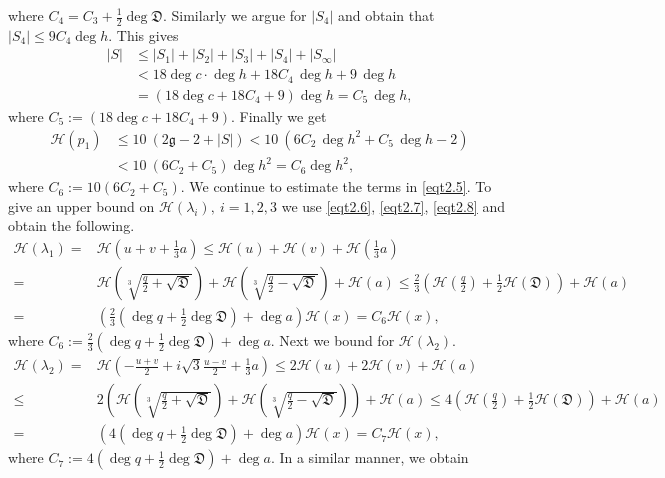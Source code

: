 \documentclass[12pt]{amsart}
\begin{document}
where $C_4=C_3+\frac{1}{2}\deg \mathfrak{D}$. Similarly we argue for $|S_{4}|$ and obtain that
$|S_4|\leq 9C_4 \deg h.$ This gives
\begin{align*}
  |S| & \le |S_1| + |S_2| + |S_3| + |S_4| + |S_\infty|\\ 
&< 18 \deg c\cdot \deg h + 18 C_4 \, \deg h+ 9\, \deg h \\
&= (18 \deg c+18 C_4 +9) \deg h =C_5\, \deg h,
\end{align*} where $C_5:=(18\deg c+18C_4+9).$
Finally we get
\begin{align*}
\mathcal{H}(p_1) &\le 10 ~(2\mathfrak{g} - 2 + |S|) < 10~(6C_2 \, \deg h^2 + C_5\, \deg h- 2) \\
&< 10~(6C_2 + C_5) \deg h^2= C_6 \deg h^2,
\end{align*}
where $C_6:=10(6C_2+C_5)$.
We continue to estimate the terms in \eqref{eqt2.5}. To give an upper bound on $\mathcal{H}(\lambda_i), ~i=1,2,3$ we use \eqref{eqt2.6}, \eqref{eqt2.7}, \eqref{eqt2.8} and obtain the following.
\begin{align*}
    \mathcal{H}(\lambda_1)=&\mathcal{H}(u+v+\frac{1}{3}a) \le \mathcal{H}(u)+\mathcal{H}(v)+\mathcal{H}(\frac{1}{3}a)\\
    =& \mathcal{H}(\sqrt[3]{\frac{q}{2}+\sqrt{\mathfrak{D}}})+\mathcal{H}(\sqrt[3]{\frac{q}{2}-\sqrt{\mathfrak{D}}})+\mathcal{H}(a) \leq  \frac{2}{3}\left(\mathcal{H}(\frac{q}{2})+\frac{1}{2}\mathcal{H}(\mathfrak{D}) \right)+\mathcal{H}(a)\\
    =& \left(\frac{2}{3}(\deg q+ \frac{1}{2}\deg \mathfrak{D})+\deg a\right) \mathcal{H}(x)=C_6\mathcal{H}(x),
\end{align*}
where $C_6:= \frac{2}{3}(\deg q+\frac{1}{2}\deg \mathfrak{D})+\deg a$. Next we bound for $\mathcal{H}(\lambda_2)$.
\begin{align*}
    \mathcal{H}(\lambda_2)=& \mathcal{H}(-\frac{u+v}{2}+ i\sqrt{3}\frac{u-v}{2}+\frac{1}{3}a)
    \leq 2\mathcal{H}(u)+2\mathcal{H}(v)+\mathcal{H}(a)\\
    \leq &2\left(\mathcal{H}(\sqrt[3]{\frac{q}{2}+\sqrt{\mathfrak{D}}})+\mathcal{H}(\sqrt[3]{\frac{q}{2}-\sqrt{\mathfrak{D}}})\right)+\mathcal{H}(a)
    \leq 4\left(\mathcal{H}(\frac{q}{2})+\frac{1}{2}\mathcal{H}(\mathfrak{D}) \right)+\mathcal{H}(a)\\
    =& \left(4(\deg q +\frac{1}{2}\deg \mathfrak{D})+\deg a \right)\mathcal{H}(x)=C_7\mathcal{H}(x),
\end{align*}
where $C_7:=4(\deg q +\frac{1}{2}\deg \mathfrak{D})+\deg a$.
In a similar manner, we obtain
\end{document}
